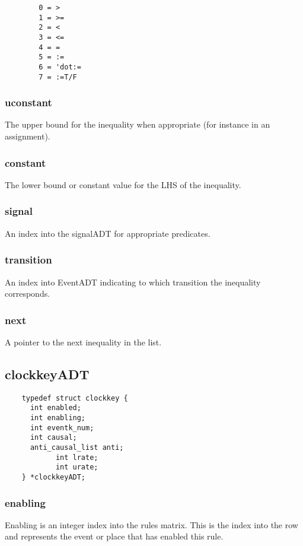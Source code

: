 \documentclass[titlepage,11pt]{article}
\begin{document}
	\begin{verbatim}
		0 = >
		1 = >=
		2 = <
		3 = <=
		4 = =
		5 = :=
		6 = 'dot:=
		7 = :=T/F
	\end{verbatim}
	
	\subsubsection{uconstant}
	The upper bound for the inequality when appropriate (for instance in an assignment).
	
	\subsubsection{constant}
	The lower bound or constant value for the LHS of the inequality.
	
	\subsubsection{signal}
	An index into the signalADT for appropriate predicates.
	
	\subsubsection{transition}
	An index into EventADT indicating to which transition the inequality corresponds.
	
	\subsubsection{next}
	A pointer to the next inequality in the list.

  \subsection{clockkeyADT}
  \begin{verbatim}
    typedef struct clockkey {
      int enabled;
      int enabling;
      int eventk_num;
      int causal;
      anti_causal_list anti;
			int lrate;
			int urate;
    } *clockkeyADT;
  \end{verbatim}
  
  \subsubsection{enabling}
  Enabling is an integer index into the rules matrix.  This is the
  index into the row and represents the event or place that has
  enabled this rule.
  
\end{document}

